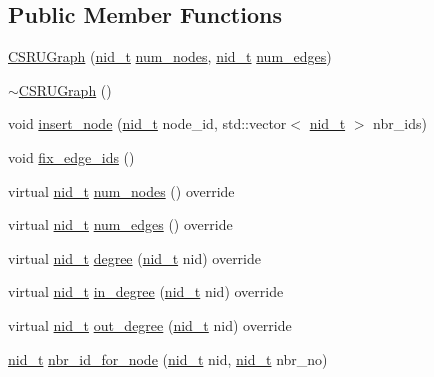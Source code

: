 \subsection*{Public Member Functions}
\begin{DoxyCompactItemize}
\item 
\mbox{\hyperlink{classRPGraph_1_1CSRUGraph_a78cc1f4446190dcd347edc6bfaa4c1b8}{C\+S\+R\+U\+Graph}} (\mbox{\hyperlink{namespaceRPGraph_ab3ae34f1ab88e48f43794c30c8697b74}{nid\+\_\+t}} \mbox{\hyperlink{classRPGraph_1_1CSRUGraph_a715af46d35bbe09b6b7d724461a1c2a5}{num\+\_\+nodes}}, \mbox{\hyperlink{namespaceRPGraph_ab3ae34f1ab88e48f43794c30c8697b74}{nid\+\_\+t}} \mbox{\hyperlink{classRPGraph_1_1CSRUGraph_a90ef3e196b0e234c8806bc455031018d}{num\+\_\+edges}})
\item 
\mbox{\hyperlink{classRPGraph_1_1CSRUGraph_a3e6cc9a4ef614b841519df3ea5d3715b}{$\sim$\+C\+S\+R\+U\+Graph}} ()
\item 
void \mbox{\hyperlink{classRPGraph_1_1CSRUGraph_a8d9cba867ebb6116cb391b78ad7ae31e}{insert\+\_\+node}} (\mbox{\hyperlink{namespaceRPGraph_ab3ae34f1ab88e48f43794c30c8697b74}{nid\+\_\+t}} node\+\_\+id, std\+::vector$<$ \mbox{\hyperlink{namespaceRPGraph_ab3ae34f1ab88e48f43794c30c8697b74}{nid\+\_\+t}} $>$ nbr\+\_\+ids)
\item 
void \mbox{\hyperlink{classRPGraph_1_1CSRUGraph_a5394625002cf95dbeac709f230d9f618}{fix\+\_\+edge\+\_\+ids}} ()
\item 
virtual \mbox{\hyperlink{namespaceRPGraph_ab3ae34f1ab88e48f43794c30c8697b74}{nid\+\_\+t}} \mbox{\hyperlink{classRPGraph_1_1CSRUGraph_a715af46d35bbe09b6b7d724461a1c2a5}{num\+\_\+nodes}} () override
\item 
virtual \mbox{\hyperlink{namespaceRPGraph_ab3ae34f1ab88e48f43794c30c8697b74}{nid\+\_\+t}} \mbox{\hyperlink{classRPGraph_1_1CSRUGraph_a90ef3e196b0e234c8806bc455031018d}{num\+\_\+edges}} () override
\item 
virtual \mbox{\hyperlink{namespaceRPGraph_ab3ae34f1ab88e48f43794c30c8697b74}{nid\+\_\+t}} \mbox{\hyperlink{classRPGraph_1_1CSRUGraph_ae2f3bb7a5ee2b53c88145a0cee6ed277}{degree}} (\mbox{\hyperlink{namespaceRPGraph_ab3ae34f1ab88e48f43794c30c8697b74}{nid\+\_\+t}} nid) override
\item 
virtual \mbox{\hyperlink{namespaceRPGraph_ab3ae34f1ab88e48f43794c30c8697b74}{nid\+\_\+t}} \mbox{\hyperlink{classRPGraph_1_1CSRUGraph_a88965d72f2fbea43b6d731d2cc027858}{in\+\_\+degree}} (\mbox{\hyperlink{namespaceRPGraph_ab3ae34f1ab88e48f43794c30c8697b74}{nid\+\_\+t}} nid) override
\item 
virtual \mbox{\hyperlink{namespaceRPGraph_ab3ae34f1ab88e48f43794c30c8697b74}{nid\+\_\+t}} \mbox{\hyperlink{classRPGraph_1_1CSRUGraph_a952e2a8eea28c0d879a0b5688d0e1b06}{out\+\_\+degree}} (\mbox{\hyperlink{namespaceRPGraph_ab3ae34f1ab88e48f43794c30c8697b74}{nid\+\_\+t}} nid) override
\item 
\mbox{\hyperlink{namespaceRPGraph_ab3ae34f1ab88e48f43794c30c8697b74}{nid\+\_\+t}} \mbox{\hyperlink{classRPGraph_1_1CSRUGraph_a17284d198dac4fb4611ffda71c679471}{nbr\+\_\+id\+\_\+for\+\_\+node}} (\mbox{\hyperlink{namespaceRPGraph_ab3ae34f1ab88e48f43794c30c8697b74}{nid\+\_\+t}} nid, \mbox{\hyperlink{namespaceRPGraph_ab3ae34f1ab88e48f43794c30c8697b74}{nid\+\_\+t}} nbr\+\_\+no)
\end{DoxyCompactItemize}
